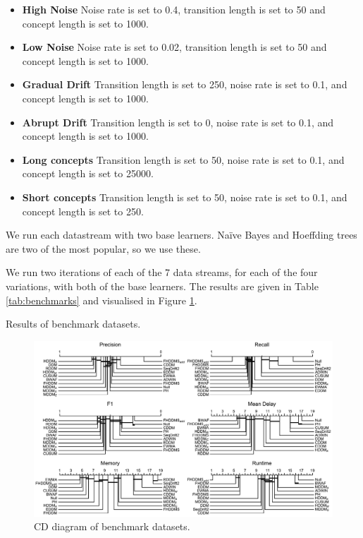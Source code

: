 \begin{itemize}
    \item {\bf High Noise} Noise rate is set to 0.4, transition length is set to 50 and concept length is set to 1000.
    \item {\bf Low Noise} Noise rate is set to 0.02, transition length is set to 50 and concept length is set to 1000.
    \item {\bf Gradual Drift} Transition length is set to 250, noise rate is set to 0.1, and concept length is set to 1000.
    \item {\bf Abrupt Drift} Transition length is set to 0, noise rate is set to 0.1, and concept length is set to 1000.
    \item {\bf Long concepts} Transition length is set to 50, noise rate is set to 0.1, and concept length is set to 25000.
    \item {\bf Short concepts} Transition length is set to 50, noise rate is set to 0.1, and concept length is set to 250.
\end{itemize}
We run each datastream with two base learners. Na\"{i}ve Bayes and Hoeffding trees \cite{hoeffding_trees} are two of the most popular, so we use these.  

We run two iterations of each of the 7 data streams, for each of the four variations, with both of the base learners. The results are given in Table \ref{tab:benchmarks} and visualised in Figure \ref{fig:benchmarks}. 

\begin{table}
    \centering
    \caption{Results of benchmark datasets.}
    
    \label{tab:benchmarks}
\end{table}

\begin{figure}
    \centering
    \includegraphics[width=\textwidth]{images/cd_diagrams/benchmark.pdf}
    \caption{CD diagram of benchmark datasets.}
    \label{fig:benchmarks}
\end{figure}

